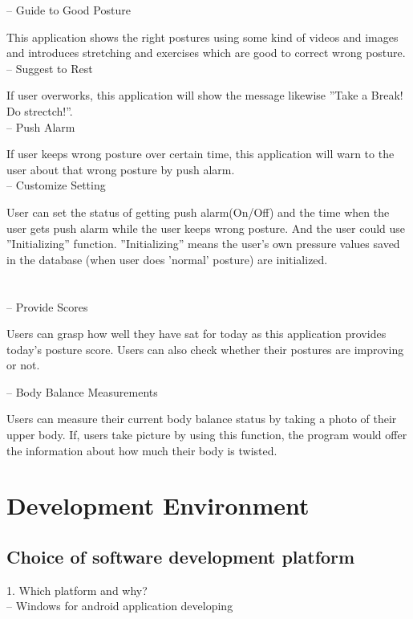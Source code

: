 \documentclass[conference]{IEEEtran}
\begin{document}
-- Guide to Good Posture

This application shows the right postures using some kind of videos and images and introduces stretching and exercises which are good to correct wrong posture.\\

-- Suggest to Rest

If user overworks, this application will show the message likewise ''Take a Break! Do strectch!''.\\

-- Push Alarm

If user keeps wrong posture over certain time, this application will warn to the user about that wrong posture by push alarm.\\

-- Customize Setting

User can set the status of getting push alarm(On/Off) and the time when the user gets push alarm while the user keeps wrong posture. And the user could use ''Initializing'' function. ''Initializing'' means the user's own pressure values saved in the database (when user does 'normal' posture) are initialized.\\\\\\

-- Provide Scores

Users can grasp how well they have sat for today as this application provides today’s posture score. Users can also check whether their postures are improving or not.

-- Body Balance Measurements

Users can measure their current body balance status by taking a photo of their upper body. If, users take picture by using this function, the program would offer the information about how much their body is twisted. 

\section{Development Environment}

\subsection{Choice of software development platform}

1. Which platform and why?  \\

-- Windows for android application developing
\end{document}
